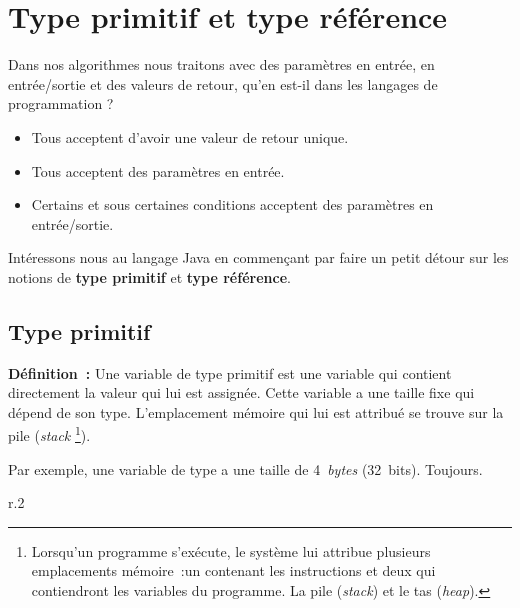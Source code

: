 \section{Type primitif et type référence}

	Dans nos algorithmes nous traitons avec des paramètres en entrée, en
	entrée/sortie et des valeurs de retour, qu'en est-il dans les langages de
	programmation ? 

	\begin{itemize}
		\item Tous acceptent d'avoir une valeur de retour unique.
		\item Tous acceptent des paramètres en entrée. 
		\item Certains et sous certaines conditions acceptent des paramètres en 
			entrée/sortie.
	\end{itemize}

	Intéressons nous au langage Java en commençant par faire un petit détour sur
	les notions de \textbf{type primitif} et \textbf{type référence}.

	\subsection{Type primitif}
	
	\textbf{Définition~:} 
	Une variable de type primitif est une variable qui contient directement la
	valeur qui lui est assignée.  Cette variable a une taille fixe qui dépend de
	son type. L'emplacement mémoire qui lui est attribué se trouve sur la pile
	(\textit{stack}
	\footnote{%
		Lorsqu'un programme s'exécute, le système lui attribue plusieurs
		emplacements mémoire~:un contenant les instructions et deux qui
		contiendront les variables du programme. La pile (\textit{stack}) et le
		tas (\textit{heap}).  
	}).
	
	Par exemple, une variable de type  a une taille de
	4~\textit{bytes} (32~bits). Toujours.
	
	\begin{wrapfigure}{r}{.2\linewidth}
	\end{wrapfigure}

